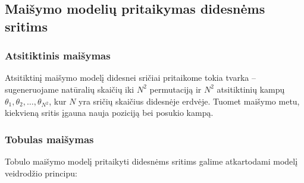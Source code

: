 \subsection{Maišymo modelių pritaikymas didesnėms sritims}

\subsubsection*{Atsitiktinis maišymas}

Atsitiktinį maišymo modelį didesnei sričiai pritaikome tokia tvarka -- sugeneruojame natūralių skaičių iki $N^2$ permutaciją ir $N^2$ atsitiktinių kampų $\theta_1, \theta_2, \dots, \theta_{N^2}$, kur $N$ yra sričių skaičius didesnėje erdvėje. Tuomet maišymo metu, kiekvieną sritis įgauna nauja poziciją bei posukio kampą.

\subsubsection*{Tobulas maišymas}

Tobulo maišymo modelį pritaikyti didesnėms sritims galime atkartodami modelį veidrodžio principu:

